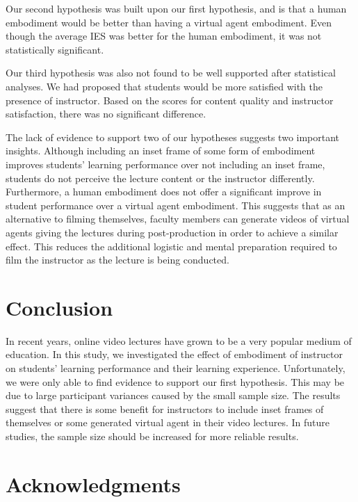 \documentclass{sigchi}
\begin{document}
Our second hypothesis was built upon our first hypothesis, and is that a human embodiment would be better than having a virtual agent embodiment. Even though the average IES was better for the human embodiment, it was not statistically significant.

Our third hypothesis was also not found to be well supported after statistical analyses. We had proposed that students would be more satisfied with the presence of instructor. Based on the scores for content quality and instructor satisfaction, there was no significant difference.

The lack of evidence to support two of our hypotheses suggests two important insights. Although including an inset frame of some form of embodiment improves students' learning performance over not including an inset frame, students do not perceive the lecture content or the instructor differently. Furthermore, a human embodiment does not offer a significant improve in student performance over a virtual agent embodiment. This suggests that as an alternative to filming themselves, faculty members can generate videos of virtual agents giving the lectures during post-production in order to achieve a similar effect. This reduces the additional logistic and mental preparation required to film the instructor as the lecture is being conducted.

%
%

\section{Conclusion}
In recent years, online video lectures have grown to be a very popular medium of education. In this study, we investigated the effect of embodiment of instructor on students' learning performance and their learning experience. Unfortunately, we were only able to find evidence to support our first hypothesis. This may be due to large participant variances caused by the small sample size. The results suggest that there is some benefit for instructors to include inset frames of themselves or some generated virtual agent in their video lectures. In future studies, the sample size should be increased for more reliable results.

\section{Acknowledgments}
\end{document}
